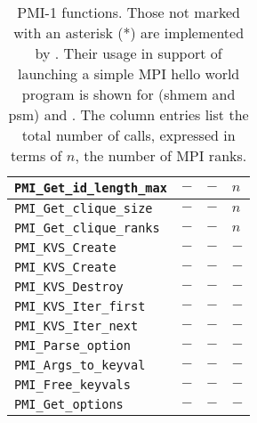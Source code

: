 \begin{table}
\begin{tabular}{|p{5cm}|p{3.5cm}|p{3cm}|p{3cm}|}
\hline
{\tt  PMI\_Get\_id\_length\_max} & $-$ & $-$ & $n$ \\
\hline
{\tt  PMI\_Get\_clique\_size} & $-$ & $-$ & $n$ \\
\hline
{\tt  PMI\_Get\_clique\_ranks} & $-$ & $-$ & $n$ \\
\hline
{\tt  PMI\_KVS\_Create} & $-$ & $-$ & $-$ \\
\hline
{\tt  PMI\_KVS\_Create} & $-$ & $-$ & $-$ \\
\hline
{\tt  PMI\_KVS\_Destroy} & $-$ & $-$ & $-$ \\
\hline
{\tt  PMI\_KVS\_Iter\_first} & $-$ & $-$ & $-$ \\
\hline
{\tt  PMI\_KVS\_Iter\_next} & $-$ & $-$ & $-$ \\
\hline
{\tt  PMI\_Parse\_option} & $-$ & $-$ & $-$ \\
\hline
{\tt  PMI\_Args\_to\_keyval} & $-$ & $-$ & $-$ \\
\hline
{\tt  PMI\_Free\_keyvals} & $-$ & $-$ & $-$ \\
\hline
{\tt  PMI\_Get\_options} & $-$ & $-$ & $-$\\
\hline
\end{tabular}
\caption{PMI-1 functions.  Those not marked with an asterisk (*) are
implemented by \slurm.
Their usage in support of launching a simple MPI hello world program
is shown for  (shmem and psm) and \openmpi.
The column entries list the total number of calls,
expressed in terms of $n$, the number of MPI ranks.}
\label{tab:pmiv1}
\end{table}
